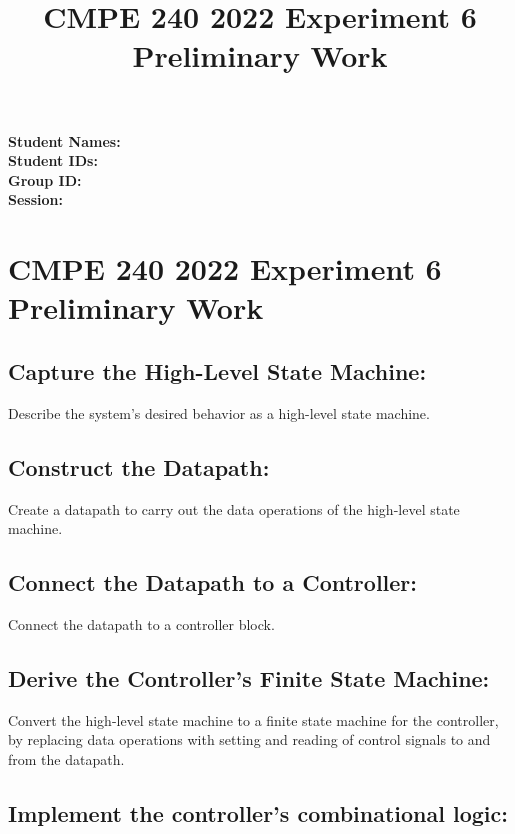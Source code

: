 \documentclass[12pt,a4paper]{report}
\title{CMPE 240 2022 Experiment 6 Preliminary Work}
\begin{document}
\noindent
\textbf{Student Names: } \\
\textbf{Student IDs: } \\
\textbf{Group ID: } \\
\textbf{Session: }

\section*{CMPE 240 2022 Experiment 6 Preliminary Work}

\subsection*{Capture the High-Level State Machine:} Describe the system’s desired behavior as a high-level state machine.

\pagebreak

\subsection*{Construct the Datapath:} Create a datapath to carry out the data operations of the high-level state machine.

\pagebreak

\subsection*{Connect the Datapath to a Controller:} Connect the datapath to a controller block.

\pagebreak

\subsection*{Derive the Controller's Finite State Machine:} Convert the high-level state machine to a finite state machine for the controller, by replacing data operations with setting and reading of control signals to and from the datapath.

\pagebreak

\subsection*{Implement the controller’s combinational logic:}

\pagebreak
\end{document}
